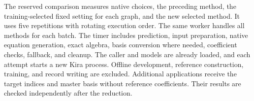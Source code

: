The reserved comparison measures native choices, the preceding method,
the training-selected fixed setting for each graph, and the new selected
method. It uses five repetitions with rotating execution order. The same
worker handles all methods for each batch. The timer includes prediction,
input preparation, native equation generation, exact algebra, basis
conversion where needed, coefficient checks, fallback, and cleanup.
The caller and models are already loaded, and each attempt starts a new
Kira process. Offline development, reference construction, training, and
record writing are excluded. Additional applications receive the target
indices and master basis without reference coefficients. Their results
are checked independently after the reduction.
